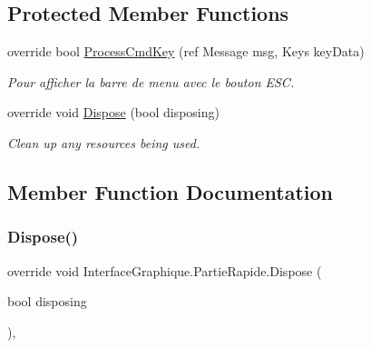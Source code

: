 \subsection*{Protected Member Functions}
\begin{DoxyCompactItemize}
\item 
\hypertarget{class_interface_graphique_1_1_partie_rapide_a7dac506aec410200b7f6600ecf06b57b}{}\label{class_interface_graphique_1_1_partie_rapide_a7dac506aec410200b7f6600ecf06b57b} 
override bool \hyperlink{class_interface_graphique_1_1_partie_rapide_a7dac506aec410200b7f6600ecf06b57b}{Process\+Cmd\+Key} (ref Message msg, Keys key\+Data)
\begin{DoxyCompactList}\small\item\em Pour afficher la barre de menu avec le bouton E\+SC. \end{DoxyCompactList}\item 
override void \hyperlink{class_interface_graphique_1_1_partie_rapide_a248957e40a9fe9d9ca2e3c90e117b192}{Dispose} (bool disposing)
\begin{DoxyCompactList}\small\item\em Clean up any resources being used. \end{DoxyCompactList}\end{DoxyCompactItemize}


\subsection{Member Function Documentation}
\hypertarget{class_interface_graphique_1_1_partie_rapide_a248957e40a9fe9d9ca2e3c90e117b192}{}\label{class_interface_graphique_1_1_partie_rapide_a248957e40a9fe9d9ca2e3c90e117b192} 
\subsubsection{\texorpdfstring{Dispose()}{Dispose()}}
{\footnotesize\ttfamily override void Interface\+Graphique.\+Partie\+Rapide.\+Dispose (\begin{DoxyParamCaption}\item[{bool}]{disposing }\end{DoxyParamCaption})\hspace{0.3cm}{\ttfamily [inline]}, {\ttfamily [protected]}}



